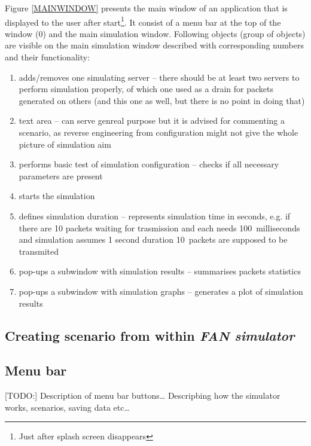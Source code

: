 \documentclass[a4paper,12pt]{article}
\begin{document}
	Figure \ref{MAINWINDOW} presents the main window of an application that is
	displayed to the user after start\footnote{Just after splash screen disappears}. It
	consist of a menu bar at the top of the window (0) and the main 
	simulation window. Following objects (group of objects) are visible on the main
	simulation window described with corresponding numbers and their functionality:
	\begin{enumerate}
	\item {adds/removes one simulating server -- there should be at least two
	servers to perform simulation properly, of which one used as a drain for
	packets generated on others (and this one as well, but there is no point in
	doing that)}
	\item {text area -- can serve genreal purpose but it is advised for commenting
	a scenario, as reverse engineering from configuration might not give the whole
	picture of simulation aim}
	\item {performs basic test of simulation configuration -- checks if all
	necessary parameters are present}
	\item {starts the simulation}
	\item {defines simulation duration -- represents simulation time in seconds,
	e.g. if there are 10 packets waiting for trasmission and each needs
	100~milliseconds and simulation assumes 1 second duration 10~packets are
	supposed to be transmited }
	\item {pop-ups a subwindow with simulation results -- summarises packets
	statistics}
	\item {pop-ups a subwindow with simulation graphs -- generates a plot
	of simulation results}
    \end{enumerate}
    
 

	\subsection{Creating scenario from within \emph{FAN simulator}}

	\subsection{Menu bar}
	
	[TODO:]
	Description of menu bar buttons\ldots
	Descripbing how the simulator works, scenarios,	saving data etc\ldots




	\newpage
\end{document}

